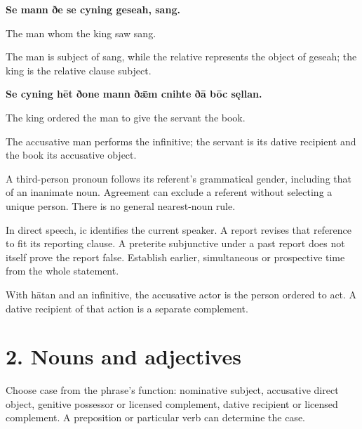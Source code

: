 \textbf{Se mann ðe se cyning geseah, sang.}

The man whom the king saw sang.

The man is subject of sang, while the relative represents the object of geseah; the king is the relative clause subject.

\textbf{Se cyning hēt ðone mann ðǣm cnihte ðā bōc sęllan.}

The king ordered the man to give the servant the book.

The accusative man performs the infinitive; the servant is its dative recipient and the book its accusative object.

A third-person pronoun follows its referent’s grammatical gender, including that of an inanimate noun. Agreement can exclude a referent without selecting a unique person. There is no general nearest-noun rule.

In direct speech, ic identifies the current speaker. A report revises that reference to fit its reporting clause. A preterite subjunctive under a past report does not itself prove the report false. Establish earlier, simultaneous or prospective time from the whole statement.

With hātan and an infinitive, the accusative actor is the person ordered to act. A dative recipient of that action is a separate complement.

\section*{2. Nouns and adjectives}

Choose case from the phrase’s function: nominative subject, accusative direct object, genitive possessor or licensed complement, dative recipient or licensed complement. A preposition or particular verb can determine the case.

